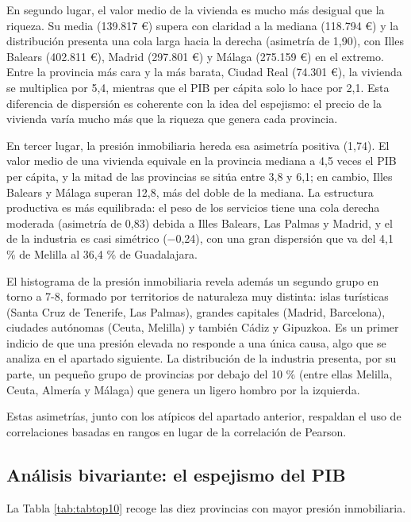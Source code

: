 \documentclass[econometrics,article,submit,moreauthors,pdftex]{Definitions/mdpi}
\begin{document}
En segundo lugar, el valor medio de la vivienda es mucho más desigual
que la riqueza. Su media (139.817 €) supera con claridad a la mediana
(118.794 €) y la distribución presenta una cola larga hacia la derecha
(asimetría de 1,90), con Illes Balears (402.811 €), Madrid (297.801 €) y
Málaga (275.159 €) en el extremo. Entre la provincia más cara y la más
barata, Ciudad Real (74.301 €), la vivienda se multiplica por 5,4,
mientras que el PIB per cápita solo lo hace por 2,1. Esta diferencia de
dispersión es coherente con la idea del espejismo: el precio de la
vivienda varía mucho más que la riqueza que genera cada provincia.

En tercer lugar, la presión inmobiliaria hereda esa asimetría positiva
(1,74). El valor medio de una vivienda equivale en la provincia mediana
a 4,5 veces el PIB per cápita, y la mitad de las provincias se sitúa
entre 3,8 y 6,1; en cambio, Illes Balears y Málaga superan 12,8, más del
doble de la mediana. La estructura productiva es más equilibrada: el
peso de los servicios tiene una cola derecha moderada (asimetría de
0,83) debida a Illes Balears, Las Palmas y Madrid, y el de la industria
es casi simétrico (−0,24), con una gran dispersión que va del 4,1 \% de
Melilla al 36,4 \% de Guadalajara.

El histograma de la presión inmobiliaria revela además un segundo grupo
en torno a 7-8, formado por territorios de naturaleza muy distinta:
islas turísticas (Santa Cruz de Tenerife, Las Palmas), grandes capitales
(Madrid, Barcelona), ciudades autónomas (Ceuta, Melilla) y también Cádiz
y Gipuzkoa. Es un primer indicio de que una presión elevada no responde
a una única causa, algo que se analiza en el apartado siguiente. La
distribución de la industria presenta, por su parte, un pequeño grupo de
provincias por debajo del 10 \% (entre ellas Melilla, Ceuta, Almería y
Málaga) que genera un ligero hombro por la izquierda.

Estas asimetrías, junto con los atípicos del apartado anterior,
respaldan el uso de correlaciones basadas en rangos en lugar de la
correlación de Pearson.

\subsection{Análisis bivariante: el espejismo del
PIB}\label{anuxe1lisis-bivariante-el-espejismo-del-pib}

La Tabla \ref{tab:tabtop10} recoge las diez provincias con mayor presión
inmobiliaria.
\end{document}
